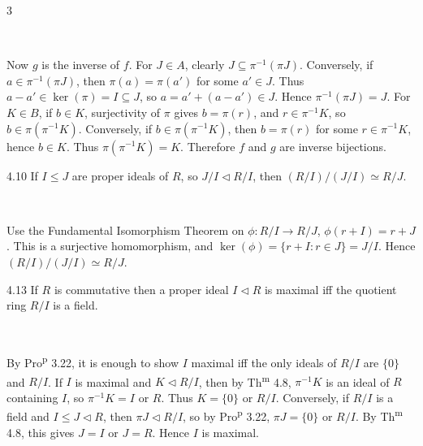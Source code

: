 \documentclass[8pt]{extarticle}
\makeatletter
\renewenvironment{proof}[1][\proofname]{%
  \begin{tcolorbox}[proofpairboxstyle]%
  \pushQED{\qed}%
  \normalfont\itshape #1\@addpunct{.}\ \normalfont\ignorespaces
}{%
  \popQED%
  \end{tcolorbox}%
}
\makeatother
\begin{document}
\begin{multicols*}{3}
\begin{proof}
            Now \(g\) is the inverse of \(f\). For \(J\in A\), clearly \(J\subseteq\pi^{-1}(\pi J)\). Conversely, if \(a\in\pi^{-1}(\pi J)\), then \(\pi(a)=\pi(a')\) for some \(a'\in J\). Thus \(a-a'\in\ker(\pi)=I\subseteq J\), so \(a=a'+(a-a')\in J\). Hence \(\pi^{-1}(\pi J)=J\). For \(K\in B\), if \(b\in K\), surjectivity of \(\pi\) gives \(b=\pi(r)\), and \(r\in\pi^{-1}K\), so \(b\in\pi(\pi^{-1}K)\). Conversely, if \(b\in\pi(\pi^{-1}K)\), then \(b=\pi(r)\) for some \(r\in\pi^{-1}K\), hence \(b\in K\). Thus \(\pi(\pi^{-1}K)=K\). Therefore \(f\) and \(g\) are inverse bijections.
        \end{proof}

        \begin{theorem}{4.10}
            If \(I\le J\) are proper ideals of \(R\), so \(J/I\lhd R/I\), then \((R/I)/(J/I)\simeq R/J\).
        \end{theorem}

        \begin{proof}
            Use the Fundamental Isomorphism Theorem on \(\phi:R/I\to R/J\), \(\phi(r+I)=r+J\). This is a surjective homomorphism, and \(\ker(\phi)=\{r+I:r\in J\}=J/I\). Hence \((R/I)/(J/I)\simeq R/J\).
        \end{proof}

        \begin{center}
            \vspace{-3pt}
            \vspace{-7pt}
        \end{center}

        \begin{corollary}{4.13}
            If \(R\) is commutative then a proper ideal \(I\lhd R\) is maximal iff the quotient ring \(R/I\) is a field.
        \end{corollary}

        \begin{proof}
            By Pro\textsuperscript{p} 3.22, it is enough to show \(I\) maximal iff the only ideals of \(R/I\) are \(\{0\}\) and \(R/I\). If \(I\) is maximal and \(K\lhd R/I\), then by Th\textsuperscript{m} 4.8, \(\pi^{-1}K\) is an ideal of \(R\) containing \(I\), so \(\pi^{-1}K=I\) or \(R\). Thus \(K=\{0\}\) or \(R/I\). Conversely, if \(R/I\) is a field and \(I\le J\lhd R\), then \(\pi J\lhd R/I\), so by Pro\textsuperscript{p} 3.22, \(\pi J=\{0\}\) or \(R/I\). By Th\textsuperscript{m} 4.8, this gives \(J=I\) or \(J=R\). Hence \(I\) is maximal.
        \end{proof}


\end{multicols*}
\end{document}
